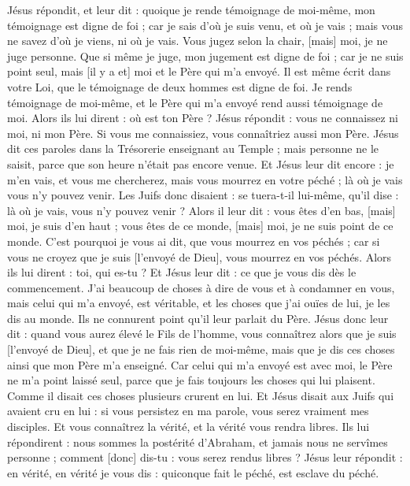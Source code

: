 \begin{multicols}{2}
Jésus répondit, et leur dit : quoique je rende témoignage de moi-même, mon témoignage est digne de foi ; car je sais d'où je suis venu, et où je vais ; mais vous ne savez d'où je viens, ni où je vais.
Vous jugez selon la chair, [mais] moi, je ne juge personne.
Que si même je juge, mon jugement est digne de foi ; car je ne suis point seul, mais [il y a et] moi et le Père qui m'a envoyé.
Il est même écrit dans votre Loi, que le témoignage de deux hommes est digne de foi.
Je rends témoignage de moi-même, et le Père qui m'a envoyé rend aussi témoignage de moi.
Alors ils lui dirent : où est ton Père ? Jésus répondit : vous ne connaissez ni moi, ni mon Père. Si vous me connaissiez, vous connaîtriez aussi mon Père.
Jésus dit ces paroles dans la Trésorerie enseignant au Temple ; mais personne ne le saisit, parce que son heure n'était pas encore venue.
Et Jésus leur dit encore : je m'en vais, et vous me chercherez, mais vous mourrez en votre péché ; là où je vais vous n'y pouvez venir.
Les Juifs donc disaient : se tuera-t-il lui-même, qu'il dise : là où je vais, vous n'y pouvez venir ?
Alors il leur dit : vous êtes d'en bas, [mais] moi, je suis d'en haut ; vous êtes de ce monde, [mais] moi, je ne suis point de ce monde.
C'est pourquoi je vous ai dit, que vous mourrez en vos péchés ; car si vous ne croyez que je suis [l'envoyé de Dieu], vous mourrez en vos péchés.
Alors ils lui dirent : toi, qui es-tu ? Et Jésus leur dit : ce que je vous dis dès le commencement.
J'ai beaucoup de choses à dire de vous et à condamner en vous, mais celui qui m'a envoyé, est véritable, et les choses que j'ai ouïes de lui, je les dis au monde.
Ils ne connurent point qu'il leur parlait du Père.
Jésus donc leur dit : quand vous aurez élevé le Fils de l'homme, vous connaîtrez alors que je suis [l'envoyé de Dieu], et que je ne fais rien de moi-même, mais que je dis ces choses ainsi que mon Père m'a enseigné.
Car celui qui m'a envoyé est avec moi, le Père ne m'a point laissé seul, parce que je fais toujours les choses qui lui plaisent.
Comme il disait ces choses plusieurs crurent en lui.
Et Jésus disait aux Juifs qui avaient cru en lui : si vous persistez en ma parole, vous serez vraiment mes disciples.
Et vous connaîtrez la vérité, et la vérité vous rendra libres.
Ils lui répondirent : nous sommes la postérité d'Abraham, et jamais nous ne servîmes personne ; comment [donc] dis-tu : vous serez rendus libres ?
Jésus leur répondit : en vérité, en vérité je vous dis : quiconque fait le péché, est esclave du péché.

\end{multicols}
